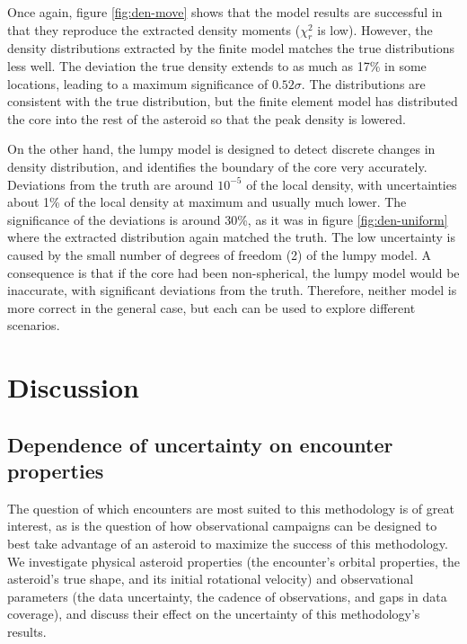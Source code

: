 \documentclass[fleqn,usenatbib]{mnras}
\begin{document}
Once again, figure \ref{fig:den-move} shows that the model results are successful in that they reproduce the extracted density moments ($\chi^2_r$ is low). However, the density distributions extracted by the finite model matches the true distributions less well. The deviation the true density extends to as much as 17\% in some locations, leading to a maximum significance of $0.52\sigma$. The distributions are consistent with the true distribution, but the finite element model has distributed the core into the rest of the asteroid so that the peak density is lowered.

On the other hand, the lumpy model is designed to detect discrete changes in density distribution, and identifies the boundary of the core very accurately. Deviations from the truth are around $10^{-5}$ of the local density, with uncertainties about 1\% of the local density at maximum and usually much lower. The significance of the deviations is around 30\%, as it was in figure \ref{fig:den-uniform} where the extracted distribution again matched the truth. The low uncertainty is caused by the small number of degrees of freedom (2) of the lumpy model. A consequence is that if the core had been non-spherical, the lumpy model would be inaccurate, with significant deviations from the truth. Therefore, neither model is more correct in the general case, but each can be used to explore different scenarios.




\section{Discussion}
\label{sec:discussion}


\subsection{Dependence of uncertainty on encounter properties}
\label{sec:fit-uncertainty}


The question of which encounters are most suited to this methodology is of great interest, as is the question of how observational campaigns can be designed to best take advantage of an asteroid to maximize the success of this methodology. We investigate physical asteroid properties (the encounter's orbital properties, the asteroid's true shape, and its initial rotational velocity) and observational parameters (the data uncertainty, the cadence of observations, and gaps in data coverage), and discuss their effect on the uncertainty of this methodology's results.
\end{document}
